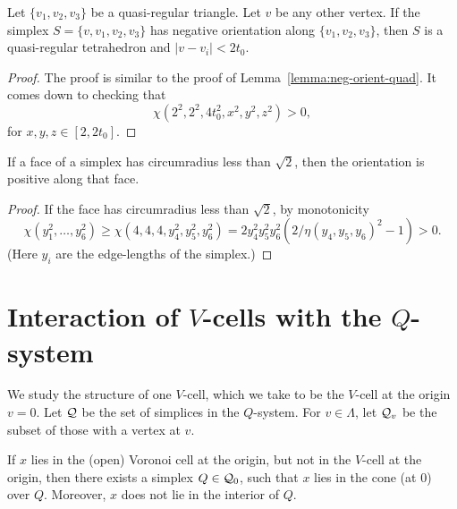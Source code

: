 \begin{lemma}
\label{lemma:neg-orient-tet} Let $\{v_1,v_2,v_3\}$ be a quasi-regular
triangle.  Let $v$ be any other vertex. If the simplex
$S=\{v,v_1,v_2,v_3\}$ has negative orientation along $\{v_1,v_2,v_3\}$,
then $S$ is a quasi-regular tetrahedron and $|v-v_i|<2t_0$.
\end{lemma}

\begin{proof} The proof is similar to the proof of
Lemma~\ref{lemma:neg-orient-quad}. It comes down to checking that
    $$
    \chi(2^2,2^2,4t_0^2,x^2,y^2,z^2)>0,$$
    for $x,y,z\in[2,2t_0]$.
\end{proof}

\begin{lemma}\label{lemma:sqrt2-chi+}
%
If a face of a simplex has circumradius less than $\sqrt2$, then
the orientation is positive along that face.
\end{lemma}

\begin{proof}
If the face has circumradius less than $\sqrt2$, by monotonicity
    $$\chi(y_1^2,\ldots,y_6^2) \ge \chi(4,4,4,y_4^2,y_5^2,y_6^2)
    = 2 y_4^2 y_5^2 y_6^2
    (2/\eta(y_4,y_5,y_6)^2 - 1) >0.$$
(Here $y_i$ are the edge-lengths of the simplex.)
\end{proof}




\section{Interaction of $V$-cells with the $Q$-system}


We study the structure of one $V$-cell, which we take to be the $V$-cell
at the origin $v=0$.  Let ${\mathcal Q}$ be the set of simplices in the
$Q$-system.  For $v\in\Lambda$, let ${\mathcal Q}_v$ be the subset of those
with a vertex at $v$.

\begin{lemma} \label{lemma:voronoi-truncation-over-Q}
If $x$ lies in the (open)  Voronoi cell at the
origin, but not in the $V$-cell at the origin, then there exists a
simplex $Q\in{\mathcal Q}_0$, such that $x$ lies in the cone (at $0$)
over $Q$. Moreover, $x$ does not lie in the interior of $Q$.
\end{lemma}

